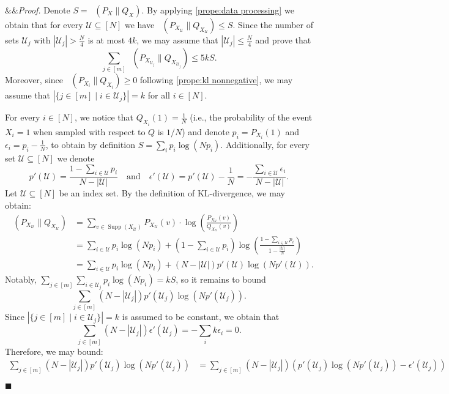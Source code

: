 \documentclass[11pt]{article}
\renewenvironment{proof}[1][]
    {\noindent
       \ifx&#1&{\it Proof.}
       \else{\it Proof ({#1}).}
       \fi}{\hfill $\blacksquare$}
\DeclareMathOperator{\KL}{D_{\text{KL}}}
\DeclareMathOperator{\Supp}{\text{Supp}}
\begin{document}
\begin{proof}
Denote $S = \KL( P_X \| Q_X )$. By applying \ref{prope:data processing} we obtain that for every $\mathcal{U} \subseteq [N]$ we have $\KL( P_{X_{\mathcal{U}}} \| Q_{X_{\mathcal{U}}} ) \le S$. Since the number of sets $\mathcal{U}_j$ with $|\mathcal{U}_j| > \frac{N}{4}$ is at most $4k$, we may assume that $|\mathcal{U}_j| \le \frac{N}{4}$ and prove that
\[
    \sum_{j \in [m]} \KL( P_{X_{\mathcal{U}_j}} \| Q_{X_{\mathcal{U}_j}} ) \le 5kS.
\]
Moreover, since $\KL( P_{X_i} \| Q_{X_i} ) \ge 0$ following \ref{prope:kl nonnegative}, we may assume that $|\{ j \in [m] \mid i \in \mathcal{U}_{j} \} | = k$ for all $i \in [N]$.

For every $i \in [N]$, we notice that $Q_{X_i}(1) = \frac{1}{N}$ (i.e., the probability of the event $X_i=1$ when sampled with respect to $Q$ is $1/N$) and denote $p_i = P_{X_i}(1)$ and $\epsilon_i = p_i - \frac{1}{N}$, to obtain by definition $S = \sum_{i}p_{i}\log(Np_{i})$.
Additionally, for every set $\mathcal{U} \subseteq [N]$ we denote
\[
    p'(\mathcal{U})=\frac{1-\sum_{i\in \mathcal{U}}p_{i}}{N-|\mathcal{U}|} \quad \text{and}\quad\epsilon'(\mathcal{U})=p'(\mathcal{U})-\frac{1}{N} = - \frac{\sum_{i\in \mathcal{U}} \epsilon_i}{N-|\mathcal{U}|}.
\]
Let $\mathcal{U} \subseteq [N]$ be an index set. By the definition of KL-divergence, we may obtain:
\begin{align*}
    \KL( P_{X_{\mathcal{U}}} \| Q_{X_{\mathcal{U}}} ) &	= \sum_{v\in \Supp(X_{\mathcal{U}})} P_{X_{\mathcal{U}}}(v)\cdot\log\left(\frac{P_{X_{\mathcal{U}}}(v)}{Q_{X_{\mathcal{U}}}(v)}\right)\\
    & = \sum_{i\in \mathcal{U}}p_{i}\log\left(Np_{i}\right) + \left(1-\sum_{i\in \mathcal{U}}p_{i} \right) \log\left(\frac{1-\sum_{i\in \mathcal{U}}p_{i}}{1-\frac{|\mathcal{U}|}{N}}\right)\\
    & =  \sum_{i\in \mathcal{U}}p_{i}\log\left(Np_{i}\right) + (N-|\mathcal{U}|) p'(\mathcal{U})\log\left(Np'(\mathcal{U})\right).
\end{align*}
Notably, $\sum_{j \in [m]}\sum_{i\in \mathcal{U}_j}p_{i}\log\left(Np_{i}\right) = kS$, so it remains to bound $$\sum_{j \in [m]}(N-|\mathcal{U}_j|)p'(\mathcal{U}_j)\log\left(Np'(\mathcal{U}_j)\right).$$
Since $|\{ j \in [m] \mid i \in \mathcal{U}_{j} \} | = k$ is assumed to be constant, we obtain that 
\[
    \sum_{j \in [m]}(N-|\mathcal{U}_j|)\epsilon'(\mathcal{U}_j) = -\sum_{i} k\epsilon_i=0.
\]
Therefore, we may bound:
\begin{align*}
    \sum_{j \in [m]}(N-|\mathcal{U}_j|)p'(\mathcal{U}_j)\log\left(Np'(\mathcal{U}_j)\right) & = \sum_{j \in [m]}(N-|\mathcal{U}_j|)\left(p'(\mathcal{U}_j)\log\left(Np'(\mathcal{U}_j)\right) - \epsilon'(\mathcal{U}_j)\right)\\

\end{align*}
\end{proof}
\end{document}
